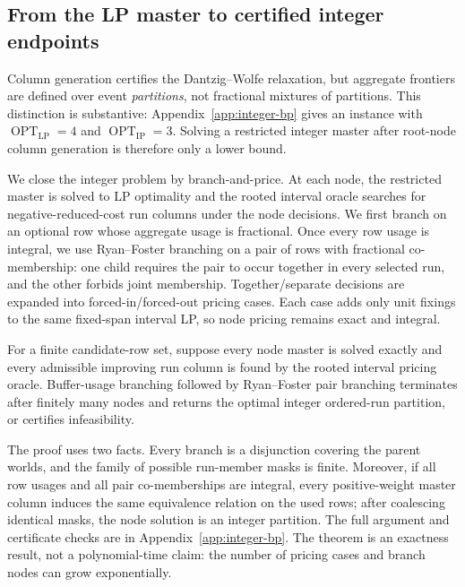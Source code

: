 \subsection{From the LP master to certified integer endpoints}
\label{sec:branch-price}

Column generation certifies the Dantzig--Wolfe relaxation, but aggregate
frontiers are defined over event \emph{partitions}, not fractional mixtures of
partitions.  This distinction is substantive: Appendix~\ref{app:integer-bp}
gives an instance with
$\operatorname{OPT}_{\mathrm{LP}}=4$ and
$\operatorname{OPT}_{\mathrm{IP}}=3$.  Solving a restricted integer master after
root-node column generation is therefore only a lower bound.

We close the integer problem by branch-and-price.  At each node, the restricted
master is solved to LP optimality and the rooted interval oracle searches for
negative-reduced-cost run columns under the node decisions.  We first branch on
an optional row whose aggregate usage is fractional.  Once every row usage is
integral, we use Ryan--Foster branching on a pair of rows with fractional
co-membership: one child requires the pair to occur together in every selected
run, and the other forbids joint membership.  Together/separate decisions are
expanded into forced-in/forced-out pricing cases.  Each case adds only unit
fixings to the same fixed-span interval LP, so node pricing remains exact and
integral.

\begin{theorem}
\label{thm:bp}
For a finite candidate-row set, suppose every node master is solved exactly and
every admissible improving run column is found by the rooted interval pricing
oracle.  Buffer-usage branching followed by Ryan--Foster pair branching
terminates after finitely many nodes and returns the optimal integer ordered-run
partition, or certifies infeasibility.
\end{theorem}

The proof uses two facts.  Every branch is a disjunction covering the parent
worlds, and the family of possible run-member masks is finite.  Moreover, if
all row usages and all pair co-memberships are integral, every positive-weight
master column induces the same equivalence relation on the used rows; after
coalescing identical masks, the node solution is an integer partition.  The
full argument and certificate checks are in Appendix~\ref{app:integer-bp}.
The theorem is an exactness result, not a polynomial-time claim: the number of
pricing cases and branch nodes can grow exponentially.


